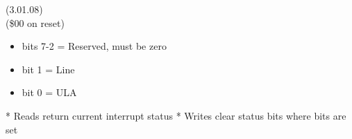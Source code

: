  (3.01.08)\\
(\$00 on reset)
\begin{itemize}
\item bits 7-2 = Reserved, must be zero
\item bit 1 = Line
\item bit 0 = ULA
\end{itemize}
* Reads return current interrupt status
* Writes clear status bits where bits are set



